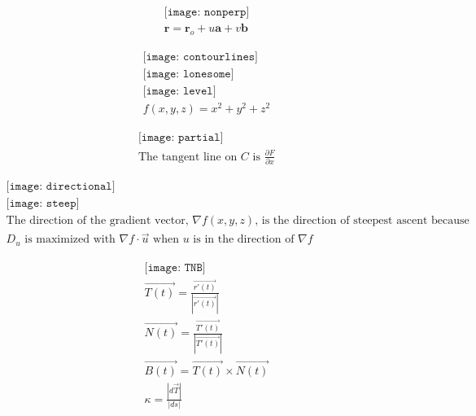 \documentclass{article}
\begin{document}
\begin{gather*}
   \texttt{[image: nonperp]}
   \\
   \boldsymbol{r} = \boldsymbol{r}_o + u\boldsymbol{a} + v\boldsymbol{b}
\end{gather*}

\begin{gather*}
   \texttt{[image: contourlines]}
   \\
   \texttt{[image: lonesome]}
   \\
   \texttt{[image: level]}
   \\
   f(x,y,z) = x^2 + y^2 + z^2
\end{gather*}

\begin{gather*}
   \texttt{[image: partial]}
   \\
   \text{The tangent line on $C$ is $\frac{\partial{F}}{\partial{x}}$}
\end{gather*}

\begin{gather*}
   \texttt{[image: directional]}
   \\
   \texttt{[image: steep]}
   \\
   \text{The direction of the gradient vector, $\nabla f(x,y,z)$, is the direction of steepest ascent because}
   \\
   \text{$D_u$ is maximized with $\nabla f\cdot\vec{u}$ when $u$ is in the direction of $\nabla f$}
\end{gather*} 

\begin{gather*}
   \texttt{[image: TNB]}
   \\
   \vec{T(t)} = \frac{\vec{r'(t)}}{|\vec{r'(t)}|} 
   \\
   \vec{N(t)} = \frac{\vec{T'(t)}}{|\vec{T'(t)}|}
   \\
   \vec{B(t)} = \vec{T(t)}\times\vec{N(t)}
   \\
   \kappa = \frac{|d\vec{T}|}{|ds|}
\end{gather*}
\end{document}
